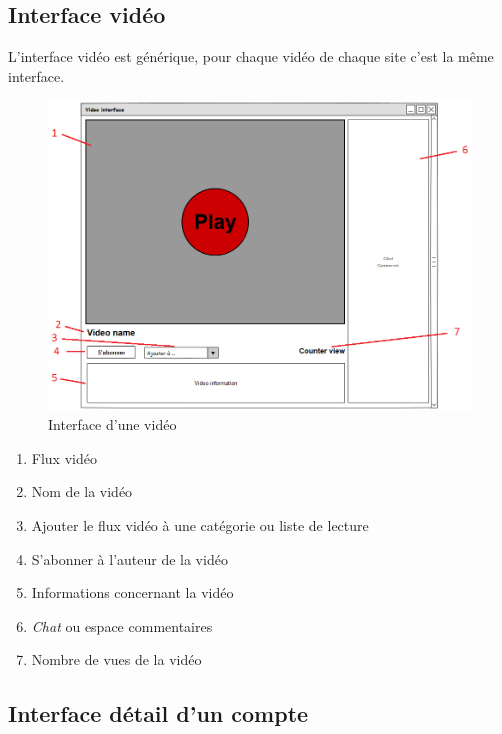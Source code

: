 \documentclass[11pt]{report} %
\begin{document}
		\subsection{Interface vidéo}
		L'interface vidéo est générique, pour chaque vidéo de chaque site c'est la même interface. 
		\begin{figure}[h]
			\center
			\includegraphics[width=1\textwidth]{../img/videoInterfacenum.png}
			\caption{Interface d'une vidéo}
			\label{interfacevideo}
		\end{figure}
		
		\begin{enumerate}
			\item Flux vidéo
			\item Nom de la vidéo
			\item Ajouter le flux vidéo à une catégorie ou liste de lecture
			\item S'abonner à l'auteur de la vidéo
			\item Informations concernant la vidéo
			\item \textit{Chat} ou espace commentaires
			\item Nombre de vues de la vidéo
		\end{enumerate}
		
		\newpage
		
		\subsection{Interface détail d'un compte}
		
\end{document}
